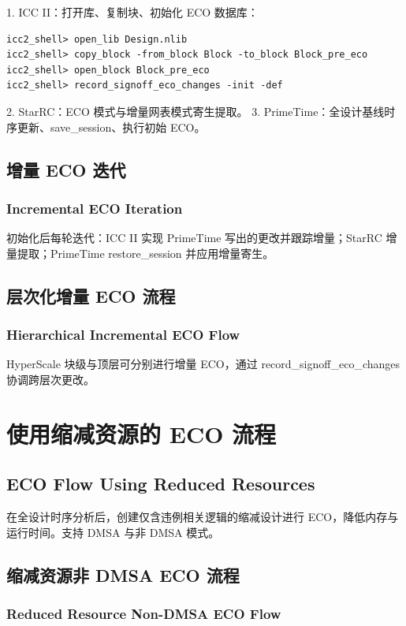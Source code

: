 1. ICC II：打开库、复制块、初始化 ECO 数据库：
\begin{lstlisting}
icc2_shell> open_lib Design.nlib
icc2_shell> copy_block -from_block Block -to_block Block_pre_eco
icc2_shell> open_block Block_pre_eco
icc2_shell> record_signoff_eco_changes -init -def
\end{lstlisting}

2. StarRC：ECO 模式与增量网表模式寄生提取。
3. PrimeTime：全设计基线时序更新、save_session、执行初始 ECO。

\subsection{增量 ECO 迭代}
\subsubsection*{Incremental ECO Iteration}

初始化后每轮迭代：ICC II 实现 PrimeTime 写出的更改并跟踪增量；StarRC 增量提取；PrimeTime restore_session 并应用增量寄生。

\subsection{层次化增量 ECO 流程}
\subsubsection*{Hierarchical Incremental ECO Flow}

HyperScale 块级与顶层可分别进行增量 ECO，通过 record_signoff_eco_changes 协调跨层次更改。

\section{使用缩减资源的 ECO 流程}
\subsection*{ECO Flow Using Reduced Resources}

在全设计时序分析后，创建仅含违例相关逻辑的缩减设计进行 ECO，降低内存与运行时间。支持 DMSA 与非 DMSA 模式。

\subsection{缩减资源非 DMSA ECO 流程}
\subsubsection*{Reduced Resource Non-DMSA ECO Flow}

